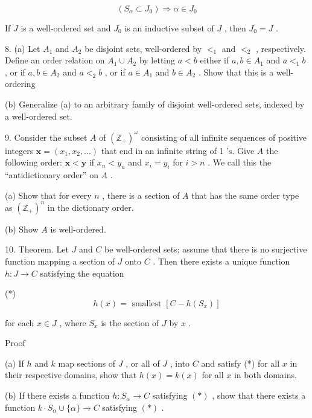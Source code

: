\[
\left( {{S}_{\alpha } \subset  {J}_{0}}\right)  \Rightarrow  \alpha  \in  {J}_{0}
\]

\begin{theorem} If \(J\) is a well-ordered set and \({J}_{0}\) is an inductive subset of \(J\) , then \({J}_{0} = J\) .
\end{theorem}

8. (a) Let \({A}_{1}\) and \({A}_{2}\) be disjoint sets, well-ordered by \({ < }_{1}\) and \({ < }_{2}\) , respectively. Define an order relation on \({A}_{1} \cup  {A}_{2}\) by letting \(a < b\) either if \(a,b \in  {A}_{1}\) and \(a{ < }_{1}b\) , or if \(a,b \in  {A}_{2}\) and \(a{ < }_{2}b\) , or if \(a \in  {A}_{1}\) and \(b \in  {A}_{2}\) . Show that this is a well-ordering

(b) Generalize (a) to an arbitrary family of disjoint well-ordered sets, indexed by a well-ordered set.

9. Consider the subset \(A\) of \({\left( {\mathbb{Z}}_{ + }\right) }^{\omega }\) consisting of all infinite sequences of positive integers \(\mathbf{x} = \left( {{x}_{1},{x}_{2},\ldots }\right)\) that end in an infinite string of 1 ’s. Give \(A\) the following order: \(\mathbf{x} < \mathbf{y}\) if \({x}_{n} < {y}_{n}\) and \({x}_{i} = {y}_{i}\) for \(i > n\) . We call this the ``antidictionary order'' on \(A\) .

(a) Show that for every \(n\) , there is a section of \(A\) that has the same order type as \({\left( {\mathbb{Z}}_{ + }\right) }^{n}\) in the dictionary order.

(b) Show \(A\) is well-ordered.

10. Theorem. Let \(J\) and \(C\) be well-ordered sets; assume that there is no surjective function mapping a section of \(J\) onto \(C\) . Then there exists a unique function \(h : J \rightarrow  C\) satisfying the equation

(*)
\[
h\left( x\right)  = \text{ smallest }\left\lbrack  {C - h\left( {S}_{x}\right) }\right\rbrack
\]

for each \(x \in  J\) , where \({S}_{x}\) is the section of \(J\) by \(x\) .

Proof

(a) If \(h\) and \(k\) map sections of \(J\) , or all of \(J\) , into \(C\) and satisfy (*) for all \(x\) in their respective domains, show that \(h\left( x\right)  = k\left( x\right)\) for all \(x\) in both domains.

(b) If there exists a function \(h : {S}_{\alpha } \rightarrow  C\) satisfying \(\left( *\right)\) , show that there exists a function \(k \cdot  {S}_{\alpha } \cup  \{ \alpha \}  \rightarrow  C\) satisfying \(\left( *\right)\) .

